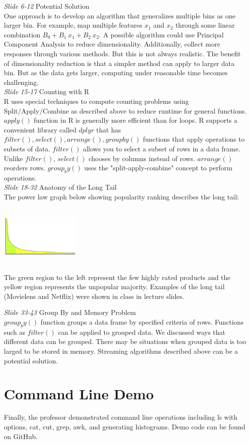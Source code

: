 {\it Slide 6-12} Potential Solution\\
\indent One approach is to develop an algorithm that generalizes multiple bins as one larger bin. For example, map multiple features $x_1$ and $x_2$ through some linear combination $B_{0} + B_{1} \ x_{1} + B_{2} \ x_{2}$. A possible algorithm could use Principal Component Analysis to reduce dimensionality. Additionally, collect more responses through various methods. But this is not always realistic. The benefit of dimensionality reduction is that a simpler method can apply to larger data bin. But as the data gets larger, computing under reasonable time becomes challenging. \\

{\it Slide 15-17} Counting with R\\
\indent R uses special techniques to compute counting problems using Split/Apply/Combine as described above to reduce runtime for general functions. $apply()$ function in R is generally more efficient than for loops. R supports a convenient library called $dplyr$ that has $filter(), select(), arrange(), groupby()$ functions that apply operations to subsets of data. $filter()$ allows you to select a subset of rows in a data frame. Unlike $filter()$, $select()$ chooses by columns instead of rows. $arrange()$ reorders rows. $group_by()$ uses the "split-apply-combine" concept to perform operations. \\

{\it Slide 18-32} Anatomy of the Long Tail\\
\indent The power law graph below showing popularity ranking describes the long tail: \\
\begin{center} \includegraphics[width=4cm, height=3cm]{figures/long_tail.png} \\ \end{center}
The green region to the left represent the few highly rated products and the yellow region represents the unpopular majority. Examples of the long tail (Movielens and Netflix) were shown in class in lecture slides.

{\it Slide 33-43} Group By and Memory Problem\\
$group_by()$ function groups a data frame by specified criteria of rows. Functions such as $filter()$ can be applied to grouped data. We discussed ways that different data can be grouped. There may be situations when grouped data is too larged to be stored in memory. Streaming algorithms described above can be a potential solution.

\section{Command Line Demo}
\indent Finally, the professor demonstrated command line operations including ls with options, cat, cut, grep, awk, and generating histograms. Demo code can be found on GitHub.



